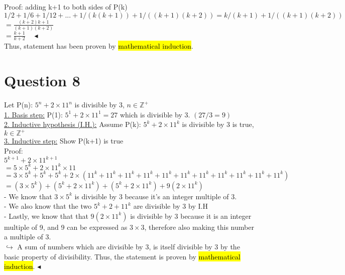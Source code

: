 \documentclass[a4paper, 12pt]{article}
\begin{document}
Proof: adding k+1 to both sides of P(k)\\

$1/2 +1/6+1/12+...+1/(k(k+1))+1/((k+1)(k+2)) = k/(k+1) + 1/((k+1)(k+2))$\\

$= \frac{(k+2)k+1}{(k+1)(k+2)}$\\

$= \frac{k+1}{k+2} \quad \blacktriangleleft$\\

Thus, statement has been proven by \hl{mathematical induction}.

\section*{Question 8}

Let P(n): $5^n +2 \times 11^n$ is divisible by 3, $n\in \mathbb{Z^+}$\\

\underline{1. Basis step:} P(1): $5^1+2\times 11^1 = 27$  which is divisible by 3. $(27/3=9)$\\

\underline{2. Inductive hypothesis (I.H.):} Assume P(k): $5^k+2 \times 11^k$ is divisible by 3 is true, $k\in \mathbb{Z^+}$\\

\underline{3. Inductive step:} Show P(k+1) is true\\

Proof:\\

$5^{k+1}+2 \times 11^{k+1}$\\
$=5\times 5^k+2\times 11^k \times 11$\\
$=3 \times 5^k+5^k+5^k+2\times (11^k+ 11^k + 11^k+11^k+11^k+11^k+11^k +11^k+11^k +11^k + 11^k)$\\
$=(3\times 5^k)+(5^k+2\times 11^k) +(5^k+ 2\times 11^k) + 9(2\times 11^k)$\\

- We know that $3\times5^k$ is divisible by 3 because it's an integer multiple of 3.\\
- We also know that the two $5^k+2+11^k$ are divisible by 3 by I.H\\
- Lastly, we know that that $9(2\times 11^k)$ is divisible by 3 because it is an integer multiple of 9, and 9 can be expressed as $3\times3$, therefore also making this number a multiple of 3. \\

$\hookrightarrow$ A sum of numbers which are divisible by 3, is itself divisible by 3 by the basic property of divisibility. Thus, the statement is proven by \hl{mathematical induction}. $\blacktriangleleft$
\end{document}
